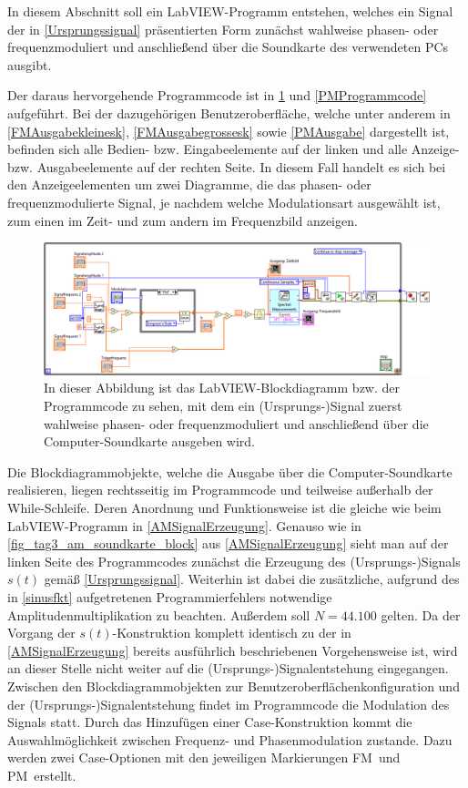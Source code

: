 \documentclass[
a4paper,
12pt,
pagesize,
ngerman
]{scrartcl}
\begin{document}
	In diesem Abschnitt soll ein LabVIEW-Programm entstehen, welches ein Signal der in \cref{Ursprungssignal} präsentierten Form zunächst wahlweise phasen- oder frequenzmoduliert und anschließend über die Soundkarte des verwendeten PCs ausgibt. 
	
	Der daraus hervorgehende Programmcode ist in \cref{FMProgrammcode} und \cref{PMProgrammcode} aufgeführt. 
	Bei der dazugehörigen Benutzeroberfläche, welche unter anderem in \cref{FMAusgabekleinesk}, \cref{FMAusgabegrossesk} sowie \cref{PMAusgabe} dargestellt ist, befinden sich alle Bedien- bzw. Eingabeelemente auf der linken und alle Anzeige- bzw. Ausgabeelemente auf der rechten Seite. 
	In diesem Fall handelt es sich bei den Anzeigeelementen um zwei Diagramme, die das phasen- oder frequenzmodulierte Signal, je nachdem welche Modulationsart ausgewählt ist, zum einen im Zeit- und zum andern im Frequenzbild anzeigen. 

	\begin{figure}[H]
		\centering
		\includegraphics[width=1.0\textwidth]{EIRE2018Dateien/Tag4/FMPM-Erzeugung/FMPM-Erzeugungd}
		\caption{In dieser Abbildung ist das LabVIEW-Blockdiagramm bzw. der Programmcode zu sehen, mit dem ein (Ursprungs-)Signal zuerst wahlweise phasen- oder frequenzmoduliert und anschließend über die Computer-Soundkarte ausgeben wird.}
		\label{FMProgrammcode}
	\end{figure}

	\noindent Die Blockdiagrammobjekte, welche die Ausgabe über die Computer-Soundkarte realisieren, liegen rechtsseitig im Programmcode und teilweise außerhalb der While-Schleife. 
	Deren Anordnung und Funktionsweise ist die gleiche wie beim LabVIEW-Programm in \cref{AMSignalErzeugung}. 
	Genauso wie in \cref{fig_tag3_am_soundkarte_block} aus \cref{AMSignalErzeugung} sieht man auf der linken Seite des Programmcodes zunächst die Erzeugung des (Ursprungs-)Signals $s(t)$ gemäß \cref{Ursprungssignal}. 
	Weiterhin ist dabei die zusätzliche, aufgrund des in \cref{sinusfkt} aufgetretenen Programmierfehlers notwendige Amplitudenmultiplikation zu beachten. 
	Außerdem soll $N = 44.100$ gelten. 
	Da der Vorgang der $s(t)$-Konstruktion komplett identisch zu der in \cref{AMSignalErzeugung} bereits ausführlich beschriebenen Vorgehensweise ist, wird an dieser Stelle nicht weiter auf die (Ursprungs-)Signalentstehung eingegangen. 
	Zwischen den Blockdiagrammobjekten zur Benutzeroberflächenkonfiguration und der (Ursprungs-)Signalentstehung findet im Programmcode die Modulation des Signals statt. 
	Durch das Hinzufügen einer Case-Konstruktion kommt die Auswahlmöglichkeit zwischen Frequenz- und Phasenmodulation zustande. 
	Dazu werden zwei Case-Optionen mit den jeweiligen Markierungen \glqq FM\grqq\ und \glqq PM\grqq\ erstellt. 
\end{document}
